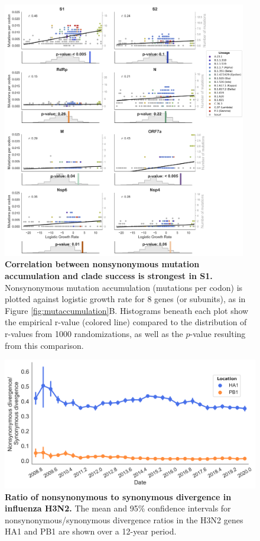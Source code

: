 \documentclass[11pt,oneside,letterpaper]{article}
\begin{document}
\begin{figure}[h!]
	\centerline{\includegraphics[width=0.95\textwidth]{fig1_supp_mutaccummoregenes.png}}
	\caption{\textbf{Correlation between nonsynonymous mutation accumulation and clade success is strongest in S1.}
	Nonsynonymous mutation accumulation (mutations per codon) is plotted against logistic growth rate for 8 genes (or subunits), as in Figure \ref{fig:mutaccumulation}B. Histograms beneath each plot show the empirical r-value (colored line) compared to the distribution of r-values from 1000 randomizations, as well as the $p$-value resulting from this comparison.
	}
	\label{fig:mutaccummoregenes}
\end{figure}

\begin{figure}[h!]
	\centerline{\includegraphics[scale=0.55]{fig2_supp_h3n2dnds.png}}
	\caption{\textbf{Ratio of nonsynonymous to synonymous divergence in influenza H3N2.}
	The mean and 95\% confidence intervals for nonsynonymous/synonymous divergence ratios in the H3N2 genes HA1 and PB1 are shown over a 12-year period.
	}
	\label{fig:h3n2dnds}
\end{figure}
\end{document}
